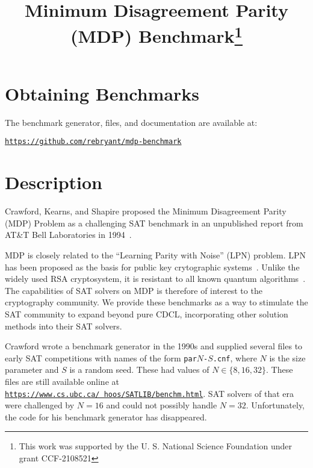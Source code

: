 \documentclass[10pt,conference]{IEEEtran}
\newcommand{\cref}[2]{\href{#1}{#2}}
\newcommand{\hcref}[1]{\cref{#1}{\small\tt #1}}
\begin{document}
\title{Minimum Disagreement Parity (MDP) Benchmark\thanks{This work was supported by the U. S. National Science Foundation under grant CCF-2108521}}

\author{
}

\maketitle

\section{Obtaining Benchmarks}

The benchmark generator, files, and documentation are available at:
\begin{center}
\hcref{https://github.com/rebryant/mdp-benchmark}
\end{center}

\section{Description}

Crawford, Kearns, and Shapire proposed the Minimum Disagreement Parity (MDP)
Problem as a challenging SAT benchmark in an unpublished report from
AT\&T Bell Laboratories in 1994~\cite{crawford:mdp:1994}.

MDP is closely related to the ``Learning Parity with Noise'' (LPN)
problem.  LPN has been proposed as the basis for public key
crytographic systems~\cite{katz:crypto:2007}.  Unlike the widely used
RSA cryptosystem, it is resistant to all known quantum
algorithms~\cite{pietrzak:sofsem:2012}.  The capabilities of SAT
solvers on MDP is therefore of interest to the cryptography community.
We provide these benchmarks as a way to stimulate 
the SAT community to expand beyond pure CDCL, incorporating other
solution methods into their SAT solvers.

Crawford wrote a benchmark generator in the 1990s and supplied several
files to early SAT competitions with names of the form
\texttt{par}$N$\texttt{-}$S$\texttt{.cnf}, where $N$ is the size
parameter and $S$ is a random seed.
These had values of $N \in \{8, 16, 32\}$.  These files are still available online at \hcref{https://www.cs.ubc.ca/~hoos/SATLIB/benchm.html}.
SAT solvers of that era were challenged by $N=16$ and
could not possibly handle $N=32$.  Unfortunately, the code for his
benchmark generator has disappeared.
\end{document}
